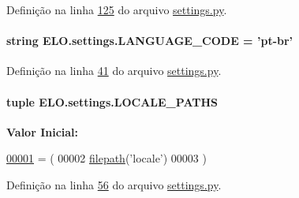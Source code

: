 Definição na linha \hyperlink{settings_8py_source_l00125}{125} do arquivo \hyperlink{settings_8py_source}{settings.\-py}.

\hypertarget{namespaceELO_1_1settings_a388841a63bae5418e55fb741f938d4fb}{
\paragraph[{L\-A\-N\-G\-U\-A\-G\-E\-\_\-\-C\-O\-D\-E}]{\setlength{\rightskip}{0pt plus 5cm}string E\-L\-O.\-settings.\-L\-A\-N\-G\-U\-A\-G\-E\-\_\-\-C\-O\-D\-E = 'pt-\/br'}}\label{namespaceELO_1_1settings_a388841a63bae5418e55fb741f938d4fb}


Definição na linha \hyperlink{settings_8py_source_l00041}{41} do arquivo \hyperlink{settings_8py_source}{settings.\-py}.

\hypertarget{namespaceELO_1_1settings_a977570dd2e9cd8142b3d65c4fa37c172}{
\paragraph[{L\-O\-C\-A\-L\-E\-\_\-\-P\-A\-T\-H\-S}]{\setlength{\rightskip}{0pt plus 5cm}tuple E\-L\-O.\-settings.\-L\-O\-C\-A\-L\-E\-\_\-\-P\-A\-T\-H\-S}}\label{namespaceELO_1_1settings_a977570dd2e9cd8142b3d65c4fa37c172}
{\bfseries Valor Inicial\-:}
\begin{DoxyCode}
\hypertarget{namespaceELO_1_1settings_l00001}{}\hyperlink{namespaceELO_1_1settings}{00001} = (
00002     \hyperlink{namespaceELO_1_1settings_a7730264ddd478343e0f282f36d4a5ab4}{filepath}(\textcolor{stringliteral}{'locale'})
00003 )
\end{DoxyCode}


Definição na linha \hyperlink{settings_8py_source_l00056}{56} do arquivo \hyperlink{settings_8py_source}{settings.\-py}.

